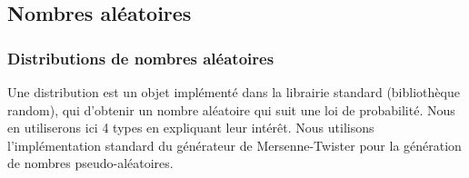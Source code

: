 \documentclass[11pt,a4paper]{article}
\begin{document}
    \subsection{Nombres aléatoires}
        \subsubsection{Distributions de nombres aléatoires}
        Une distribution est un objet implémenté dans la librairie standard (bibliothèque random), qui d'obtenir un nombre aléatoire qui suit une loi de probabilité.
        Nous en utiliserons ici 4 types en expliquant leur intérêt.
        Nous utilisons l'implémentation standard du générateur de Mersenne-Twister pour la génération de nombres pseudo-aléatoires.
        \begin{mdframed}[backgroundcolor=light-gray, roundcorner=20pt, innerleftmargin=20, innertopmargin=1, innerbottommargin=1, outerlinewidth=1, linecolor=darkgray]
            
        \end{mdframed}
\end{document}
